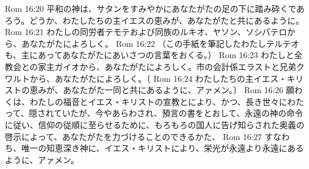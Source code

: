 Rom 16:20  平和の神は、サタンをすみやかにあなたがたの足の下に踏み砕くであろう。どうか、わたしたちの主イエスの恵みが、あなたがたと共にあるように。
Rom 16:21  わたしの同労者テモテおよび同族のルキオ、ヤソン、ソシパテロから、あなたがたによろしく。
Rom 16:22  （この手紙を筆記したわたしテルテオも、主にあってあなたがたにあいさつの言葉をおくる。）
Rom 16:23  わたしと全教会との家主ガイオから、あなたがたによろしく。市の会計係エラストと兄弟クワルトから、あなたがたによろしく。〔
Rom 16:24  わたしたちの主イエス・キリストの恵みが、あなたがた一同と共にあるように、アァメン。〕
Rom 16:26  願わくは、わたしの福音とイエス・キリストの宣教とにより、かつ、長き世々にわたって、隠されていたが、今やあらわされ、預言の書をとおして、永遠の神の命令に従い、信仰の従順に至らせるために、もろもろの国人に告げ知らされた奥義の啓示によって、あなたがたを力づけることのできるかた、
Rom 16:27  すなわち、唯一の知恵深き神に、イエス・キリストにより、栄光が永遠より永遠にあるように、アァメン。


